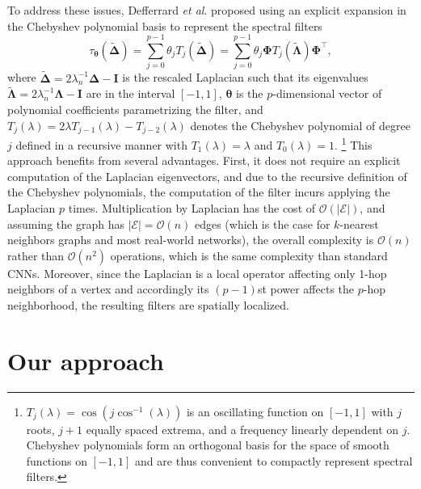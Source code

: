 \documentclass{article}
\newcommand{\etal}{\textit{et al}. }
\begin{document}
To address these issues, Defferrard \etal \citeyear{defferrard2016convolutional} proposed using an explicit expansion in the Chebyshev polynomial basis to represent the spectral filters\vspace{-1mm}
\begin{equation} \label{eq:filt_cheby}
	\tau_{\boldsymbol{\theta}}(\tilde{\boldsymbol{\Delta}}) = \sum_{j=0}^{p-1} \theta_j T_j(\tilde{\boldsymbol{\Delta}}) = \sum_{j=0}^{p-1} \theta_j  \boldsymbol{\Phi} T_j(\tilde{\boldsymbol{\Lambda}})\boldsymbol{\Phi}^\top,
\end{equation}
where $\tilde{\boldsymbol{\Delta}} = 2 \lambda_{n}^{-1}\boldsymbol{\Delta}  - \mathbf{I}$ is the rescaled Laplacian such that its eigenvalues $\tilde{\boldsymbol{\Lambda}} = 2 \lambda_{n}^{-1} \boldsymbol{\Lambda}  - \mathbf{I}$ are in the interval $[-1,1]$, 
$\boldsymbol{\theta}$ is the $p$-dimensional vector of polynomial coefficients parametrizing the filter, and $T_j(\lambda) = 2\lambda T_{j-1}(\lambda) - T_{j-2}(\lambda)$ denotes the Chebyshev polynomial of degree $j$ defined in a recursive manner with $T_1(\lambda) =\lambda$ and $T_0(\lambda) =1$. \footnote{$T_j(\lambda) = \cos(j \cos^{-1}(\lambda))$ is an oscillating function on $[-1, 1]$ with $j$ roots, $j+1$ equally spaced extrema, and a frequency linearly dependent on $j$. Chebyshev polynomials form an orthogonal basis for the space of smooth functions on $[-1,1]$ and are thus convenient to compactly represent spectral filters.}
This approach benefits from several advantages. First, it does not require an explicit computation of the Laplacian eigenvectors, and due to the recursive definition of the Chebyshev polynomials, the computation of the filter incurs applying the Laplacian $p$ times. Multiplication by Laplacian has the cost of $\mathcal{O}(|\mathcal{E}|)$, and assuming the graph has $|\mathcal{E}| = \mathcal{O}(n)$ edges (which is the case for $k$-nearest neighbors graphs and most real-world networks), the overall complexity is $\mathcal{O}(n)$ rather than $\mathcal{O}(n^2)$ operations, which is the same complexity than standard CNNs.
Moreover, since the Laplacian is a local operator affecting only 1-hop neighbors of a vertex and accordingly its $(p-1)$st power affects the $p$-hop neighborhood, the resulting filters are spatially localized. 





\section{Our approach}
\label{sec:our_model}
\end{document}
